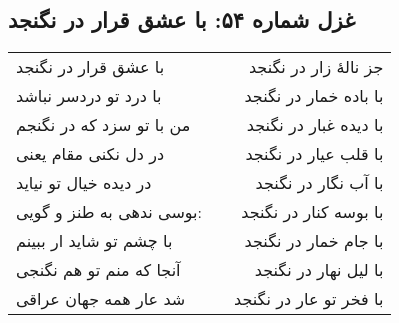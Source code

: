 \begin{center}
\section*{غزل شماره ۵۴: با عشق قرار در نگنجد}
\label{sec:054}
\begin{longtable}{l p{0.5cm} r}
با عشق قرار در نگنجد
&&
جز نالهٔ زار در نگنجد
\\
با درد تو دردسر نباشد
&&
با باده خمار در نگنجد
\\
من با تو سزد که در نگنجم
&&
با دیده غبار در نگنجد
\\
در دل نکنی مقام یعنی
&&
با قلب عیار در نگنجد
\\
در دیده خیال تو نیاید
&&
با آب نگار در نگنجد
\\
بوسی ندهی به طنز و گویی:
&&
با بوسه کنار در نگنجد
\\
با چشم تو شاید ار ببینم
&&
با جام خمار در نگنجد
\\
آنجا که منم تو هم نگنجی
&&
با لیل نهار در نگنجد
\\
شد عار همه جهان عراقی
&&
با فخر تو عار در نگنجد
\\
\end{longtable}
\end{center}
